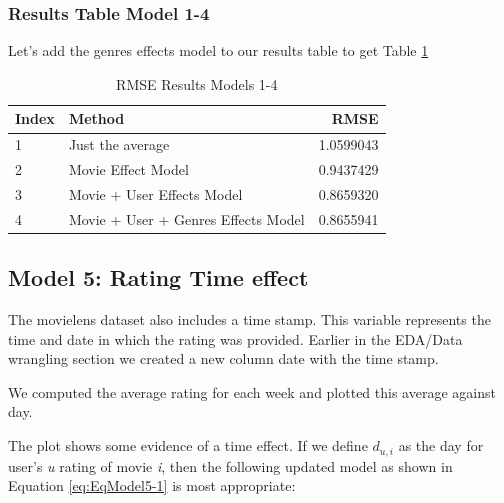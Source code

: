 \documentclass[
]{article}
\begin{document}
\newpage

\hypertarget{results-table-model-1-4}{%
\subsubsection{Results Table Model 1-4}\label{results-table-model-1-4}}

Let's add the genres effects model to our results table to get Table
\ref{tbl:rmse_results_model_1-4}

\begin{table}[H]

\caption{\label{tab:ge_6}RMSE Results Models 1-4\label{tbl:rmse_results_model_1-4}}
\centering
\fontsize{7}{9}\selectfont
\begin{tabular}[t]{llr}
\toprule
Index & Method & RMSE\\
\midrule
1 & Just the average & 1.0599043\\
2 & Movie Effect Model & 0.9437429\\
3 & Movie + User Effects Model & 0.8659320\\
4 & Movie + User + Genres Effects Model & 0.8655941\\
\bottomrule
\end{tabular}
\end{table}

\newpage

\hypertarget{model-5-rating-time-effect}{%
\subsection{Model 5: Rating Time
effect}\label{model-5-rating-time-effect}}

The movielens dataset also includes a time stamp. This variable
represents the time and date in which the rating was provided. Earlier
in the EDA/Data wrangling section we created a new column date with the
time stamp.

We computed the average rating for each week and plotted this average
against day.

The plot shows some evidence of a time effect. If we define \(d_{u,i}\)
as the day for user's \emph{u} rating of movie \emph{i}, then the
following updated model as shown in Equation \ref{eq:EqModel5-1} is most
appropriate:

%
\par
\end{document}
